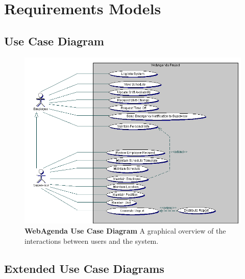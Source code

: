 \documentclass[letterpaper,12pt]{report}
\begin{document}
\part{Requirements Models} 
\chapter{Use Case Diagram}
\newpage

\begin{figure}[htp]
 \includegraphics[scale=0.8]{externals/UseCaseDiagram.png}
 \caption{\small
\textbf{WebAgenda Use Case Diagram }\newline A graphical overview of the interactions between users and the system.}\label{fig:usecase}

\end{figure}


\chapter{Extended Use Case Diagrams}
\newcommand{\xuchead}{
		\begin{tabular}{| p{8.5cm} | p{8.5cm} |}
		\hline 
			\cellcolor[gray]{0.8}\textbf{Actor}\index{actor} &\cellcolor[gray]{0.8} \textbf{System}\index{system} \\ 
		\hline
		\end{tabular}
		\newline
		\newline
}
\end{document}
